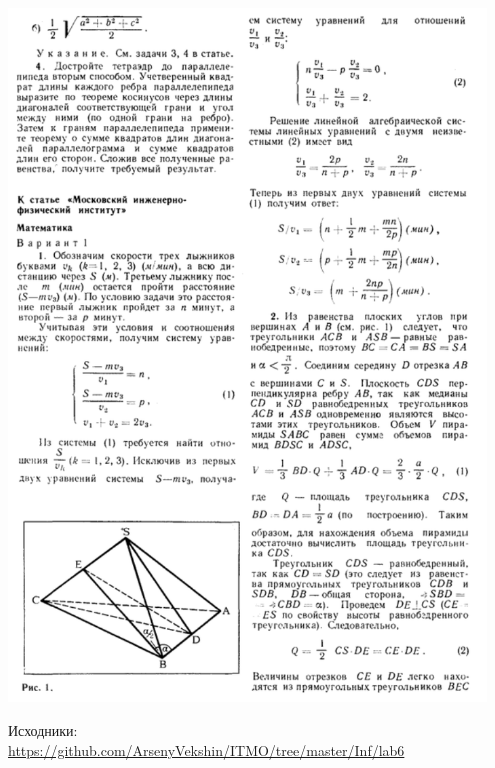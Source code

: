 \newpage
\includegraphics[width=0.95\textwidth]{orig.png}

\newpage
Исходники:\\
\url{https://github.com/ArsenyVekshin/ITMO/tree/master/Inf/lab6} \\